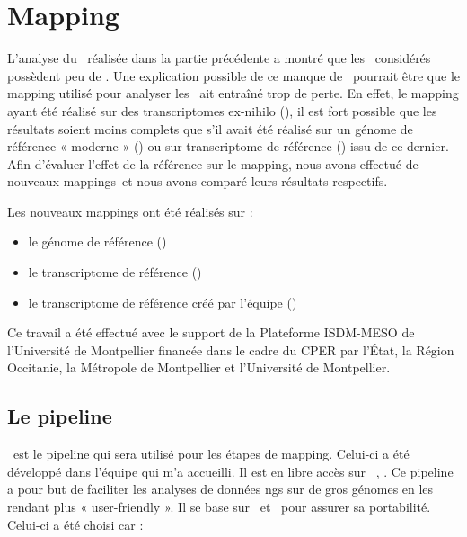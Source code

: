 \documentclass[../main]{subfiles} %
\begin{document}
\addto\extrasfrench{\protected\edef:{\unexpanded\expandafter{:}}}

\section{Mapping}
\label{sec:Mapping}
L’analyse du \NbSNP réalisée dans la partie précédente a montré que les \contigs considérés possèdent peu de \SNP. Une explication possible de ce manque de \SNP pourrait être que le \gls{mapping} utilisé pour analyser les \contigs ait entraîné trop de perte. En effet, le \gls{mapping} ayant été réalisé sur des \glspl{transcriptome} ex-nihilo (\TrEx), il est fort possible que les résultats soient moins complets que s'il avait été réalisé sur un génome de référence « moderne » (\GeMo) ou sur \gls{transcriptome} de référence (\TrMo) issu de ce dernier. Afin d’évaluer l’effet de la référence sur le \gls{mapping}, nous avons effectué de nouveaux \glspl{mapping} et nous avons comparé leurs résultats respectifs.

Les nouveaux  \glspl{mapping} ont été réalisés sur :
\begin{itemize}
\item le génome de référence (\GeMo)
\item le \gls{transcriptome} de référence (\TrMo)
\item le \gls{transcriptome} de référence créé par l'équipe (\TrEx)
\end{itemize}

Ce travail a été effectué avec le support de la Plateforme ISDM-MESO de l’Université de Montpellier financée dans le cadre du CPER par l’État, la Région Occitanie, la Métropole de Montpellier et l’Université de Montpellier.

\subsection{Le pipeline}
\label{sec:GeCKO}

\GeCKO est le pipeline qui sera utilisé pour les étapes de \gls{mapping}. Celui-ci a été développé dans l’équipe qui m’a accueilli. Il est en libre accès sur \GitHub \cite{noauthor_ge2popgecko_2024}, \cite{ardisson_gecko_2024}. Ce pipeline a pour but de faciliter les analyses de données \acrshort{ngs} sur de gros génomes en les rendant plus « user-friendly ». Il se base sur \Conda et \SnakeMake pour assurer sa portabilité. Celui-ci a été choisi car :
\end{document}
